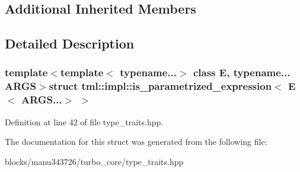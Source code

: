\subsection*{Additional Inherited Members}


\subsection{Detailed Description}
\subsubsection*{template$<$template$<$ typename...$>$ class E, typename... A\+R\+G\+S$>$struct tml\+::impl\+::is\+\_\+parametrized\+\_\+expression$<$ E$<$ A\+R\+G\+S...$>$ $>$}



Definition at line 42 of file type\+\_\+traits.\+hpp.



The documentation for this struct was generated from the following file\+:\begin{DoxyCompactItemize}
\item 
blocks/manu343726/turbo\+\_\+core/type\+\_\+traits.\+hpp\end{DoxyCompactItemize}
